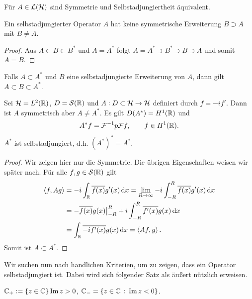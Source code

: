 \begin{bem*}[Bemerkungen.]
\begin{bemenum}
\item Für $A\in\mathcal{L}(\mathcal{H})$ sind Symmetrie und Selbstadjungiertheit äquivalent.
\item Ein selbstadjungierter Operator $A$ hat keine symmetrische Erweiterung
$B\supset A$ mit $B\neq A$.
\begin{proof}
Aus $A\subset B\subset B^*$ und $A=A^*$ folgt $A=A^*\supset B^* \supset B\supset
A$ und somit $A=B$.\qedhere
\end{proof}
\item Falls $A\subset A^*$ und $B$ eine selbstadjungierte Erweiterung von $A$,
dann gilt $A\subset B\subset A^*$.\maphere
\end{bemenum}
\end{bem*}

\begin{bsp*}
Sei $\mathcal{H}=L^2(\mathbb{R})$, $D=\mathcal{S}(\mathbb{R})$ und $A:D\subset \mathcal{H}\to \mathcal{H}$ definiert durch $f =
-if'$. Dann ist $A$ symmetrisch aber $A\neq A^*$. Es gilt $D(A^*) = H^1(\mathbb{R})$ und
\begin{align*}
A^*f= \mathcal{F}^{-1}p \mathcal{F} f,\qquad f\in H^1(\mathbb{R}).
\end{align*}
$A^*$ ist selbstadjungiert, d.h. $(A^*)^*=A^*$.
\begin{proof}
Wir zeigen hier nur die Symmetrie. Die übrigen Eigenschaften weisen wir später
nach. Für alle $f,g\in \mathcal{S}(\mathbb{R})$ gilt
\begin{align*}
\left\langle f,Ag\right\rangle &= -i \int_{\mathbb{R}} \overline{f(x)}g'(x)\,\mathrm{d} x
= \lim\limits_{R\to\infty} -i \int_{-R}^R \overline{f(x)}g'(x)\,\mathrm{d} x\\
&= -\overline{f(x)}g(x)\big|_{-R}^R  + i \int_{-R}^R \overline{f'(x)}g(x)\,\mathrm{d} x\\
&= \int_{\mathbb{R}} \overline{-if'(x)}g(x)\,\mathrm{d} x = \left\langle Af,g\right\rangle.
\end{align*}
Somit ist $A\subset A^*$.\qedhere\bsphere
\end{proof}
\end{bsp*}


Wir suchen nun nach handlichen Kriterien, um zu zeigen, dass ein Operator
selbstadjungiert ist. Dabei wird sich folgender Satz als äußert nützlich
erweisen.

\begin{bem*}[Notation.]
$\mathbb{C}_+ := \left\{ z\in\mathbb{C} \right\}{\operatorname{Im} z > 0}$, $\mathbb{C}_- = \left\{ z\in\mathbb{C}\,:\,\operatorname{Im} z < 0\right\}$.\maphere
\end{bem*}

